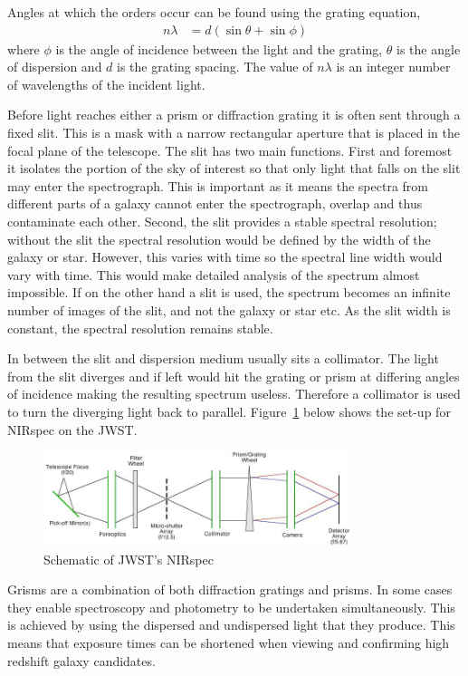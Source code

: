 	Angles at which the orders occur can be found using the grating equation\cite{DiffGrating},
	\begin{align}
		n\lambda &= d(\sin\theta + \sin\phi)
	\end{align}
	where $\phi$ is the angle of incidence between the light and the grating, $\theta$ is the angle of dispersion and $d$ is the grating spacing. The value of $n\lambda$ is an integer number of wavelengths of the incident light.

	Before light reaches either a prism or diffraction grating it is often sent through a fixed slit. This is a mask with a narrow rectangular aperture that is placed in the focal plane of the telescope. The slit has two main functions. First and foremost it isolates the portion of the sky of interest so that only light that falls on the slit may enter the spectrograph. This is important as it means the spectra from different parts of a galaxy cannot enter the spectrograph, overlap and thus contaminate each other. Second, the slit provides a stable spectral resolution; without the slit the spectral resolution would be defined by the width of the galaxy or star. However, this varies with time so the spectral line width would vary with time. This would make detailed analysis of the spectrum almost impossible. If on the other hand a slit is used, the spectrum becomes an infinite number of images of the slit, and not the galaxy or star etc. As the slit width is constant, the spectral resolution remains stable\cite{SpectoG}.

	In between the slit and dispersion medium usually sits a collimator. The light from the slit diverges and if left would hit the grating or prism at differing angles of incidence making the resulting spectrum useless. Therefore a collimator is used to turn the diverging light back to parallel. Figure~\ref{fig:nirspec_jwst} below shows the set-up for NIRspec on the JWST.
	\begin{figure}[htbp]
		\centering
			\includegraphics[width=0.8\textwidth]{../Images/nirspec_jwst.jpeg}
		\caption{\label{fig:nirspec_jwst} Schematic of JWST's NIRspec}
	\end{figure}

	Grisms are a combination of both diffraction gratings and prisms. In some cases they enable spectroscopy and photometry to be undertaken simultaneously. This is achieved by using the dispersed and undispersed light that they produce. This means that exposure times can be shortened when viewing and confirming high redshift galaxy candidates.

